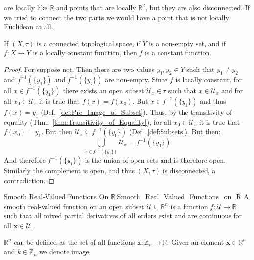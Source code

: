     are locally like $\mathbb{R}$ and points that are locally $\mathbb{R}^{2}$,
    but they are also disconnected. If we tried to connect the two parts we
    would have a point that is not locally Euclidean at all.
    \begin{theorem}
        If $(X,\tau)$ is a connected topological space, if $Y$ is a non-empty
        set, and if $f:X\rightarrow{Y}$ is a locally constant function, then
        $f$ is a constant function.
    \end{theorem}
    \begin{proof}
        For suppose not. Then there are two values $y_{1},y_{2}\in{Y}$ such that
        $y_{1}\ne{y_{2}}$ and $f^{\minus{1}}(\{y_{1}\})$ and
        $f^{\minus{1}}(\{y_{2}\})$ are non-empty. Since $f$ is locally constant,
        for all $x\in{f}^{\minus{1}}(\{y_{1}\})$ there exists an open subset
        $\mathcal{U}_{x}\in\tau$ such that $x\in\mathcal{U}_{x}$ and for all
        $x_{0}\in\mathcal{U}_{x}$ it is true that $f(x)=f(x_{0})$. But
        $x\in{f}^{\minus{1}}(\{y_{1}\})$ and thus $f(x)=y_{1}$
        (Def.~\ref{def:Pre_Image_of_Subset}). Thus, by the transitivity of
        equality (Thm.~\ref{thm:Transitivity_of_Equality}), for all
        $x_{0}\in\mathcal{U}_{x}$ it is true that $f(x_{0})=y_{1}$. But then
        $\mathcal{U}_{x}\subseteq{f}^{\minus{1}}(\{y_{1}\})$
        (Def.~\ref{def:Subsets}). But then:
        \begin{equation}
            \bigcup_{x\in{f}^{\minus{1}}(\{y_{1}\})}\mathcal{U}_{x}
            =f^{\minus{1}}(\{y_{1}\})
        \end{equation}
        And therefore $f^{\minus{1}}(\{y_{1}\})$ is the union of open sets and
        is therefore open. Similarly the complement is open, and thus
        $(X,\tau)$ is disconnected, a contradiction.
    \end{proof}
    \begin{fdefinition}{Smooth Real-Valued Functions On $\mathbb{R}$}
                       {Smooth_Real_Valued_Functions_on_R}
        A smooth real-valued function on an open subset
        $\mathcal{U}\subseteq\mathbb{R}^{n}$ is a function
        $f:\mathcal{U}\rightarrow\mathbb{R}$ such that all mixed partial
        derivatives of all orders exist and are continuous for all
        $\mathbf{x}\in\mathcal{U}$.
    \end{fdefinition}
    $\mathbb{R}^{n}$ can be defined as the set of all functions
    $\mathbf{x}:\mathbb{Z}_{n}\rightarrow\mathbb{R}$. Given an element
    $\mathbf{x}\in\mathbb{R}^{n}$ and $k\in\mathbb{Z}_{n}$ we denote image
